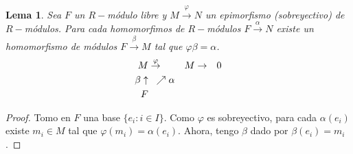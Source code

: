 \documentclass[11pt,a4paper]{article}
\theoremstyle{break}
\newtheorem{lemma}[theorem]{Lema}
\begin{document}
\begin{lemma}
Sea $F$ un $R-$módulo libre y $M \overset{\varphi}{\to} N$ un epimorfismo (sobreyectivo) de $R-$módulos. Para cada homomorfimos de $R-$módulos $F \overset{\alpha}{\to} N$ existe un homomorfismo de módulos $F \overset{\beta}{\to} M$ tal que $\varphi \beta = \alpha$.
$$\begin{aligned}
M & \overset{\varphi}{\to} & M & \to & 0 \\
\beta \uparrow & \hspace{0.2cm} \nearrow \alpha & & & \\
F & & & &
\end{aligned}$$
\end{lemma}

\begin{proof}
Tomo en $F$ una base $\{e_{i}: i \in I\}$. Como $\varphi$ es sobreyectivo, para cada $\alpha(e_{i})$ existe $m_{i} \in M$ tal que $\varphi(m_{i}) = \alpha(e_{i})$. Ahora, tengo $\beta$ dado por $\beta(e_{i}) = m_{i}$.
\end{proof}
\end{document}
